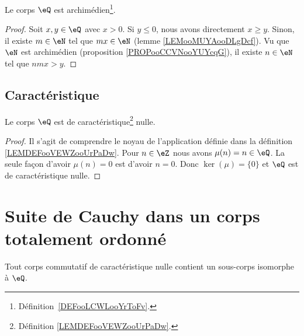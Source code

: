 \begin{proposition}     \label{PROPooMXGPooDUkOuv}
	Le corps \( \eQ\) est archimédien\footnote{Définition~\ref{DEFooLCWLooYrToFv}.}.
\end{proposition}

\begin{proof}
	Soit \( x,y\in\eQ\) avec \( x>0\). Si \( y\leq 0\), nous avons directement \( x\geq y\). Sinon, il existe \( m\in \eN\) tel que \( mx\in \eN\) (lemme \ref{LEMooMUYAooDLgDcf}). Vu que \( \eN\) est archimédien (proposition \ref{PROPooCCVNooYUYcqG}), il existe \( n\in \eN\) tel que \( nmx>y\).
\end{proof}


\subsection{Caractéristique}

\begin{lemma}       \label{LEMooYCPUooNxEPhB}
	Le corps \( \eQ\) est de caractéristique\footnote{Définition \ref{LEMDEFooVEWZooUrPaDw}.} nulle.
\end{lemma}

\begin{proof}
	Il s'agit de comprendre le noyau de l'application définie dans la définition \ref{LEMDEFooVEWZooUrPaDw}. Pour \( n\in \eZ\) nous avons \( \mu(n)=n\in \eQ\). La seule façon d'avoir \( \mu(n)=0\) est d'avoir \( n=0\). Donc \( \ker(\mu)=\{ 0 \}\) et \( \eQ\) est de caractéristique nulle.
\end{proof}

\section{Suite de Cauchy dans un corps totalement ordonné}


\begin{lemma}        \label{LEMooLTBIooSZnvsQ}
	Tout corps commutatif de caractéristique nulle contient un sous-corps isomorphe à \( \eQ\).
\end{lemma}

